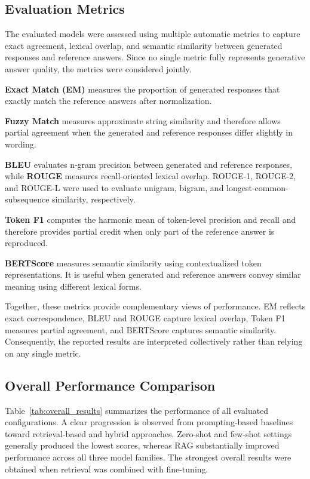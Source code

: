 \documentclass[10pt,journal,compsoc]{IEEEtran}
\begin{document}
\subsection{Evaluation Metrics}

The evaluated models were assessed using multiple automatic metrics to
capture exact agreement, lexical overlap, and semantic similarity between
generated responses and reference answers. Since no single metric fully
represents generative answer quality, the metrics were considered jointly.

\textbf{Exact Match (EM)} measures the proportion of generated responses
that exactly match the reference answers after normalization.

\textbf{Fuzzy Match} measures approximate string similarity and therefore
allows partial agreement when the generated and reference responses differ
slightly in wording.

\textbf{BLEU} evaluates n-gram precision between generated and reference
responses, while \textbf{ROUGE} measures recall-oriented lexical overlap.
ROUGE-1, ROUGE-2, and ROUGE-L were used to evaluate unigram, bigram, and
longest-common-subsequence similarity, respectively.

\textbf{Token F1} computes the harmonic mean of token-level precision and
recall and therefore provides partial credit when only part of the reference
answer is reproduced.

\textbf{BERTScore} measures semantic similarity using contextualized token
representations. It is useful when generated and reference answers convey
similar meaning using different lexical forms.

Together, these metrics provide complementary views of performance. EM
reflects exact correspondence, BLEU and ROUGE capture lexical overlap,
Token F1 measures partial agreement, and BERTScore captures semantic
similarity. Consequently, the reported results are interpreted collectively
rather than relying on any single metric.

\subsection{Overall Performance Comparison}

Table~\ref{tab:overall_results} summarizes the performance of all evaluated
configurations. A clear progression is observed from prompting-based
baselines toward retrieval-based and hybrid approaches. Zero-shot and
few-shot settings generally produced the lowest scores, whereas RAG
substantially improved performance across all three model families. The
strongest overall results were obtained when retrieval was combined with
fine-tuning.
\end{document}
